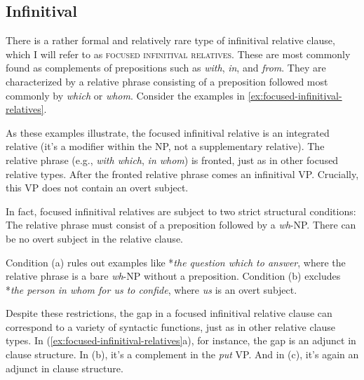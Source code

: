 \subsection{Infinitival}

There is a rather formal and relatively rare type of infinitival relative clause, which I will refer to as \textsc{focused infinitival relatives}. These are most commonly found as complements of prepositions such as \textit{with}, \textit{in}, and \textit{from}. They are characterized by a relative phrase consisting of a preposition followed most commonly by \textit{which} or \textit{whom}. Consider the examples in \ref{ex:focused-infinitival-relatives}.

\begin{samepage}
    \ea \label{ex:focused-infinitival-relatives}
        \z
    \z
\end{samepage}

As these examples illustrate, the focused infinitival relative is an integrated relative (it's a modifier within the NP, not a supplementary relative). The relative phrase (e.g., \textit{with which}, \textit{in whom}) is fronted, just as in other focused relative types. After the fronted relative phrase comes an infinitival VP. Crucially, this VP does not contain an overt subject.

In fact, focused infinitival relatives are subject to two strict structural conditions:
\ea \label{ex:focused-infinitival-restrictions}
    \ea  The relative phrase must consist of a preposition followed by a \textit{wh}-NP.
    \ex  There can be no overt subject in the relative clause.
    \z
\z

Condition (a) rules out examples like *\textit{the question which to answer}, where the relative phrase is a bare \textit{wh}-NP without a preposition. Condition (b) excludes *\textit{the person in whom for us to confide}, where \textit{us} is an overt subject.

Despite these restrictions, the gap in a focused infinitival relative clause can correspond to a variety of syntactic functions, just as in other relative clause types. In (\ref{ex:focused-infinitival-relatives}a), for instance, the gap is an adjunct in clause structure. In (b), it's a complement in the \textit{put} VP. And in (c), it's again an adjunct in clause structure.

